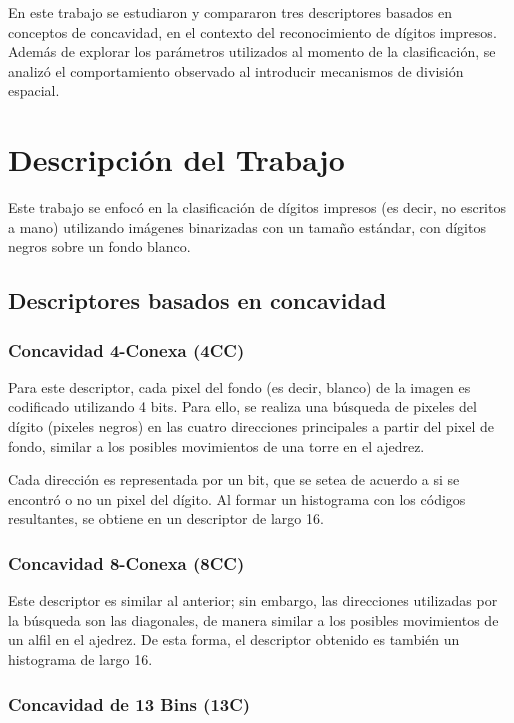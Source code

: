 \documentclass[12pt]{article}
\begin{document}
En este trabajo se estudiaron y compararon tres descriptores basados en
conceptos de concavidad, en el contexto del reconocimiento de dígitos impresos.
Además de explorar los parámetros utilizados al momento de la clasificación, se
analizó el comportamiento observado al introducir mecanismos de división
espacial. 

\section{Descripción del Trabajo}

Este trabajo se enfocó en la clasificación de dígitos impresos (es decir, no
escritos a mano) utilizando imágenes binarizadas con un tamaño estándar, con
dígitos negros sobre un fondo blanco.


\subsection{Descriptores basados en concavidad}

\subsubsection{Concavidad 4-Conexa (4CC)}

Para este descriptor, cada pixel del fondo (es decir, blanco) de la imagen es
codificado utilizando 4 bits. Para ello, se realiza una búsqueda de pixeles del
dígito (pixeles negros) en las cuatro direcciones principales a partir del pixel
de fondo, similar a los posibles movimientos de una torre en el ajedrez. 

Cada dirección es representada por un bit, que se setea de acuerdo a si se
encontró o no un pixel del dígito. Al formar un histograma con los códigos
resultantes, se obtiene en un descriptor de largo 16. 

\subsubsection{Concavidad 8-Conexa (8CC)}

Este descriptor es similar al anterior; sin embargo, las direcciones utilizadas
por la búsqueda son las diagonales, de manera similar a los posibles movimientos
de un alfil en el ajedrez. De esta forma, el descriptor obtenido es también un
histograma de largo 16.

\subsubsection{Concavidad de 13 Bins (13C)}
\end{document}
